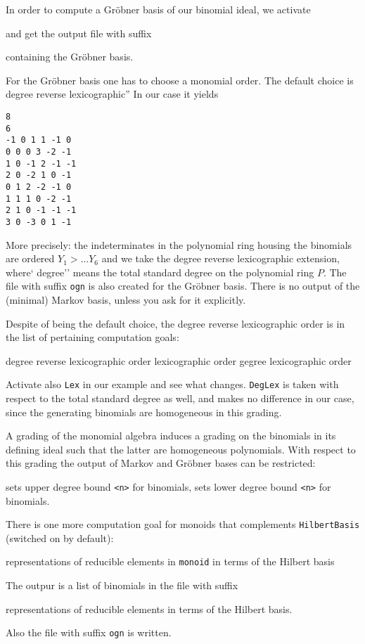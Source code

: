 In order to compute a Gröbner basis of our binomial ideal, we activate
\begin{itemize}
	\itemtt[GroebnerBasis]
\end{itemize}
and get the output file with suffix
\begin{itemize}
	\itemtt[grb] containing the Gröbner basis.
\end{itemize}
For the Gröbner basis one has to choose a monomial order. The default choice is degree reverse lexicographic'' In our case it yields
\begin{Verbatim}
8
6
-1 0 1 1 -1 0 
0 0 0 3 -2 -1 
1 0 -1 2 -1 -1 
2 0 -2 1 0 -1 
0 1 2 -2 -1 0 
1 1 1 0 -2 -1 
2 1 0 -1 -1 -1 
3 0 -3 0 1 -1 
\end{Verbatim}
More precisely: the indeterminates in the polynomial ring housing the binomials are ordered $Y_1 > \dots Y_6$ and we take the degree reverse lexicographic extension, where`  degree'' means the total standard degree on the polynomial ring $P$. The file with suffix \verb|ogn| is also created for the Gröbner basis. There is no output of the (minimal) Markov basis, unless you ask for it explicitly. 

Despite of being the default choice, the degree reverse lexicographic order is in the list of pertaining computation goals:
\begin{itemize}
	\itemtt[RevLex] degree reverse lexicographic order
	\itemtt[Lex] lexicographic order
	\itemtt[DegLex] gegree lexicographic order 
\end{itemize}
Activate also \verb|Lex| in our example and see what changes. \verb|DegLex| is taken with respect to the total standard degree as well, and makes no difference in our case, since the generating binomials are homogeneous in this grading.

A grading of the monomial algebra induces a grading on the binomials in its defining ideal such that the latter are homogeneous polynomials. With respect to this grading  the output of Markov and Gröbner bases can be restricted:
\begin{itemize}
	 sets upper degree bound \verb|<n>| for binomials,
	 sets lower degree bound  \verb|<n>| for binomials. 
\end{itemize}

There is one more computation goal for monoids that complements \verb|HilbertBasis| (switched on by default):
\begin{itemize}
	\itemtt[Representations] representations of reducible elements in \verb|monoid| in terms of the Hilbert basis
\end{itemize}
The outpur is a list of binomials in the file with suffix
\begin{itemize}
	\itemtt[rep] representations  of reducible elements in terms of the Hilbert basis.
\end{itemize}
Also the file with suffix \verb|ogn| is written.

